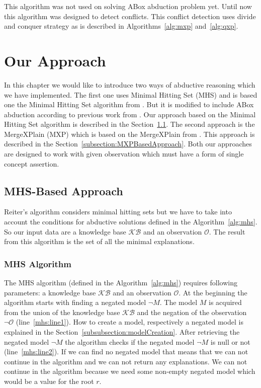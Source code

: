 \documentclass[12pt,a4paper]{article}
\begin{document}
This algorithm was not used on solving ABox abduction problem yet. Until now this algorithm was designed to detect conflicts. This conflict detection uses divide and conquer strategy as is described in Algorithms~\ref{alg:mxp} and~\ref{alg:qxp}.

\pagebreak
\section{Our Approach}
In this chapter we would like to introduce two ways of abductive reasoning which we have implemented. The first one uses Minimal Hitting Set (MHS) and is based one the Minimal Hitting Set algorithm from \cite{reiterHS}. But it is modified to include ABox abduction according to previous work from \cite{pukancovaPreliminaryReport}. Our approach based on the Minimal Hitting Set algorithm is described in the Section~\ref{subsection:MHSBasedApproach}. The second approach is the MergeXPlain (MXP) which is based on the MergeXPlain from \cite{MXP}. This approach is described in the Section~\ref{subsection:MXPBasedApproach}. Both our approaches are designed to work with given observation which must have a form of single concept assertion.

\subsection{MHS-Based Approach}
\label{subsection:MHSBasedApproach}
Reiter's algorithm considers minimal hitting sets but we have to take into account the conditions for abductive solutions defined in the Algorithm~\ref{alg:mhs}. So our input data are a knowledge base $\mathcal{KB}$ and an observation $\mathcal{O}$. The result from this algorithm is the set of all the minimal explanations.

\subsubsection{MHS Algorithm}
The MHS algorithm (defined in the Algorithm~\ref{alg:mhs}) requires following parameters: a knowledge base $\mathcal{KB}$ and an observation $\mathcal{O}$. At the beginning the algorithm starts with finding a negated model $\neg M$. The model $M$ is acquired from the union of the knowledge base $\mathcal{KB}$ and the negation of the observation $\neg \mathcal{O}$ (line~\ref{mhs:line1}). How to create a model, respectively a negated model is explained in the Section~\ref{subsubsection:modelCreation}. After retrieving the negated model $\neg M$ the algorithm checks if the negated model $\neg M$ is null or not (line~\ref{mhs:line2}). If we can find no negated model that means that we can not continue in the algorithm and we can not return any explanations. We can not continue in the algorithm because we need some non-empty negated model which would be a value for the root $r$.
\end{document}
